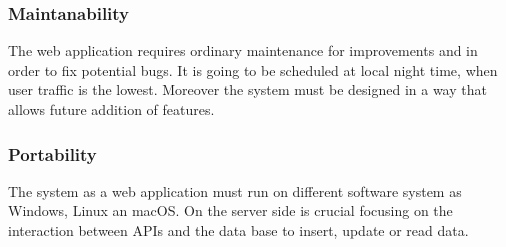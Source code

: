 \subsubsection{Maintanability}
The web application requires ordinary maintenance for improvements and in order to fix potential bugs. 
It is going to be scheduled at local night time, when user traffic is the lowest.
Moreover the system must be designed in a way that allows future addition of features.

\subsubsection{Portability}
The system as a web application must run on different software system as Windows, Linux an macOS.
On the server side is crucial focusing on the interaction between APIs and the data base to insert, update or read data.

